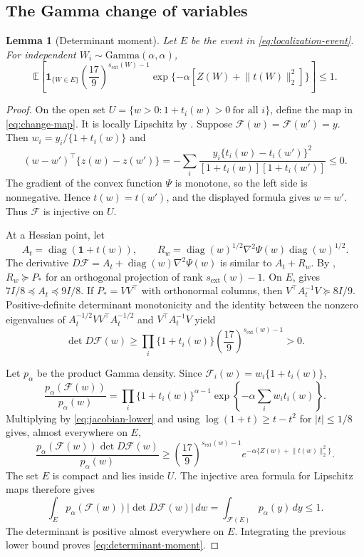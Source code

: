 \documentclass[11pt]{article}
\newtheorem{lemma}[theorem]{Lemma}
\theoremstyle{definition}
\theoremstyle{remark}
\DeclareMathOperator{\diag}{diag}
\newcommand{\EE}{\mathbb E}
\newcommand{\one}{\bm 1}
\newcommand{\norm}[1]{\lVert #1\rVert}
\newcommand{\abs}[1]{\lvert #1\rvert}
\begin{document}
\subsection{The Gamma change of variables}

\begin{lemma}[Determinant moment]
\label{lem:determinant-moment}
Let $E$ be the event in \eqref{eq:localization-event}.  For independent
$W_i\sim\mathrm{Gamma}(\alpha,\alpha)$,
\begin{equation}\label{eq:determinant-moment}
 \EE\left[\bm 1_{\{W\in E\}}
 \left(\frac{17}{9}\right)^{s_{\mathrm{ext}}(W)-1}
 \exp\{-\alpha[Z(W)+\norm{t(W)}_2^2]\}\right]\le1.
\end{equation}
\end{lemma}

\begin{proof}
On the open set
$U=\{w>0:1+t_i(w)>0\ \text{for all }i\}$, define the map in
\eqref{eq:change-map}.  It is locally Lipschitz by .
Suppose $\mathcal F(w)=\mathcal F(w')=y$.  Then
$w_i=y_i/\{1+t_i(w)\}$ and
\[
 (w-w')^\top\{z(w)-z(w')\}
 =-\sum_i\frac{y_i\{t_i(w)-t_i(w')\}^2}
 {[1+t_i(w)][1+t_i(w')]}\le0.
\]
The gradient of the convex function $\Psi$ is monotone, so the left side is
nonnegative.  Hence $t(w)=t(w')$, and the displayed formula gives $w=w'$.
Thus $\mathcal F$ is injective on $U$.

At a Hessian point, let
\[
 A_t=\diag(\one+t(w)),\qquad
 R_w=\diag(w)^{1/2}\nabla^2\Psi(w)\diag(w)^{1/2}.
\]
The derivative $D\mathcal F=A_t+\diag(w)\nabla^2\Psi(w)$ is similar to
$A_t+R_w$.  By ,
$R_w\succeq P_*$ for an orthogonal projection of rank
$s_{\mathrm{ext}}(w)-1$.  On $E$,  gives
$7I/8\preceq A_t\preceq9I/8$.  If $P_*=VV^\top$ with orthonormal columns,
then $V^\top A_t^{-1}V\succeq8I/9$.  Positive-definite determinant
monotonicity and the identity between the nonzero eigenvalues of
$A_t^{-1/2}VV^\top A_t^{-1/2}$ and $V^\top A_t^{-1}V$ yield
\begin{equation}\label{eq:jacobian-lower}
 \det D\mathcal F(w)
 \ge\prod_i\{1+t_i(w)\}
 \left(\frac{17}{9}\right)^{s_{\mathrm{ext}}(w)-1}>0.
\end{equation}

Let $p_\alpha$ be the product Gamma density.  Since
$\mathcal F_i(w)=w_i\{1+t_i(w)\}$,
\[
 \frac{p_\alpha(\mathcal F(w))}{p_\alpha(w)}
 =\prod_i\{1+t_i(w)\}^{\alpha-1}
   \exp\left\{-\alpha\sum_iw_it_i(w)\right\}.
\]
Multiplying by \eqref{eq:jacobian-lower} and using
$\log(1+t)\ge t-t^2$ for $\abs{t}\le1/8$ gives, almost everywhere on $E$,
\[
 \frac{p_\alpha(\mathcal F(w))\det D\mathcal F(w)}{p_\alpha(w)}
 \ge\left(\frac{17}{9}\right)^{s_{\mathrm{ext}}(w)-1}
 e^{-\alpha\{Z(w)+\norm{t(w)}_2^2\}}.
\]
The set $E$ is compact and lies inside $U$.  The injective area formula for Lipschitz maps
\citep[Chapter 3]{evansgariepy2015} therefore gives
\[
 \int_Ep_\alpha(\mathcal F(w))\abs{\det D\mathcal F(w)}\,dw
 =\int_{\mathcal F(E)}p_\alpha(y)\,dy\le1.
\]
The determinant is positive almost everywhere on $E$.  Integrating the
previous lower bound proves \eqref{eq:determinant-moment}.
\end{proof}
\end{document}
